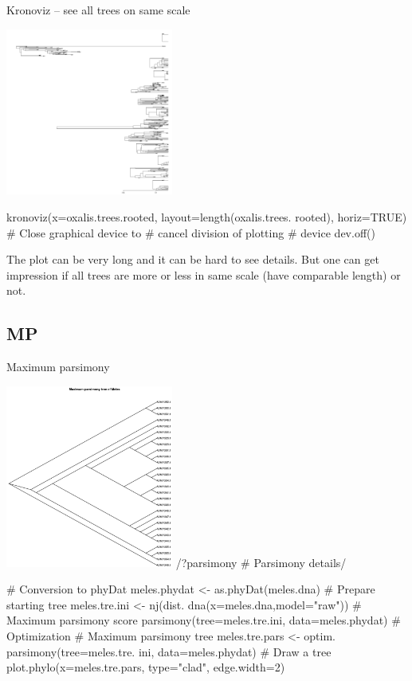 \documentclass[compress, ucs, xelatex, 11pt, xcolor=svgnames,
  hyperref={
    bookmarks=true,
    unicode=true,
    colorlinks=true,
    pdftitle={Molecular data in R},
    plainpages=false,
    pdfauthor={Vojtech Zeisek},
    pdfsubject={Course about phylogeny and evolution in R},
    pdfcreator={XeLaTeX},
    pdfkeywords={R, evolution, phylogeny, molecular data},
    linkcolor=Tomato,
    anchorcolor=SaddleBrown,
    citecolor=Goldenrod,
    filecolor=DarkMagenta,
    menucolor=Sienna,
    urlcolor=DarkTurquoise,
    pdftex},
  url={hyphens, lowtilde} %
  ]{beamer}
\begin{document}
\begin{frame}[fragile]{Kronoviz -- see all trees on same scale}
\begin{multicols}{2}
  \includegraphics[height=5.5cm]{kronoviz.png}
  \columnbreak
  \begin{spluscode}
    kronoviz(x=oxalis.trees.rooted,
      layout=length(oxalis.trees.
      rooted), horiz=TRUE)
    # Close graphical device to
    # cancel division of plotting
    # device
    dev.off()
  \end{spluscode}
  \vfill
  The plot can be very long and it can be hard to see details. But one can get impression if all trees are more or less in same scale (have comparable length) or not.
\end{multicols}
\end{frame}

\subsection{MP}

\begin{frame}[fragile]{Maximum parsimony}
\begin{multicols}{2}
  \includegraphics[height=6cm]{parsimony.png}
  \splus/?parsimony # Parsimony details/
  \begin{spluscode}
    # Conversion to phyDat
    meles.phydat <-
      as.phyDat(meles.dna)
    # Prepare starting tree
    meles.tre.ini <- nj(dist.
      dna(x=meles.dna,model="raw"))
    # Maximum parsimony score
    parsimony(tree=meles.tre.ini,
      data=meles.phydat)
    # Optimization
    # Maximum parsimony tree
    meles.tre.pars <- optim.
      parsimony(tree=meles.tre.
      ini, data=meles.phydat)
    # Draw a tree
    plot.phylo(x=meles.tre.pars,
      type="clad", edge.width=2)
  \end{spluscode}
\end{multicols}
\end{frame}
\end{document}
